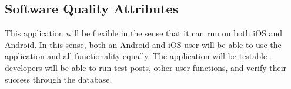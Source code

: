 \documentclass[letterpaper, 10, draftclsnofoot, onecolumn]{IEEEtran}
\begin{document}

\subsection{Software Quality Attributes}
This application will be flexible in the sense that it can run on both iOS and Android. In this sense, both an Android and iOS user will be able to use the application and all functionality equally. The application will be testable - developers will be able to run test posts, other user functions, and verify their success through the database. 

\end{document}

